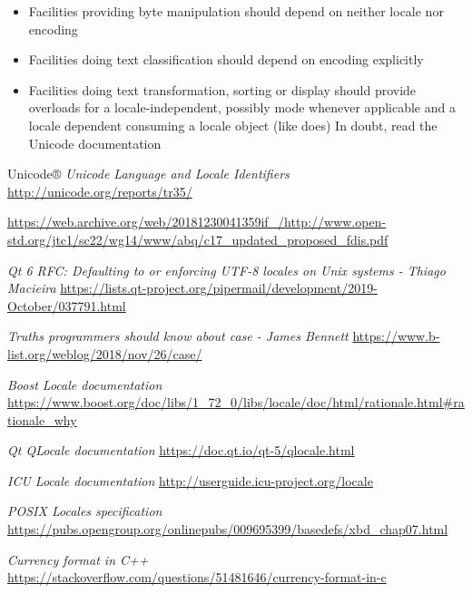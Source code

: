 \documentclass{wg21}
\begin{document}
\begin{itemize}
\item Facilities providing byte manipulation should depend on neither locale nor encoding
\item Facilities doing text classification should depend on encoding explicitly 
\item Facilities doing text transformation, sorting or display should provide overloads for a locale-independent, possibly  mode whenever applicable and a locale dependent consuming a locale object (like  does)
In doubt, read the Unicode documentation
\end{itemize}






\renewcommand{\section}[2]{}%
\begin{thebibliography}{9}
    \nocite{N4830}
    
    Unicode®
    \emph{Unicode Language and Locale Identifiers}\newline
    \url{http://unicode.org/reports/tr35/}

    \url{https://web.archive.org/web/20181230041359if_/http://www.open-std.org/jtc1/sc22/wg14/www/abq/c17_updated_proposed_fdis.pdf}  
       
    \emph{Qt 6 RFC: Defaulting to or enforcing UTF-8 locales on Unix systems - Thiago Macieira }\newline
    \url{https://lists.qt-project.org/pipermail/development/2019-October/037791.html}    
    
    
    \emph{Truths programmers should know about case -  James Bennett}\newline
    \url{https://www.b-list.org/weblog/2018/nov/26/case/}
    
    \emph{Boost Locale documentation}\newline
    \url{https://www.boost.org/doc/libs/1_72_0/libs/locale/doc/html/rationale.html#rationale_why}
    
    \emph{Qt QLocale documentation}\newline
    \url{https://doc.qt.io/qt-5/qlocale.html} 
    
    
    \emph{ICU Locale documentation}\newline
    \url{http://userguide.icu-project.org/locale} 
    
    \emph{POSIX Locales specification}\newline
    \url{https://pubs.opengroup.org/onlinepubs/009695399/basedefs/xbd_chap07.html}
    
    
    \emph{Currency format in C++}\newline
    \url{https://stackoverflow.com/questions/51481646/currency-format-in-c}
     
\end{thebibliography}
\end{document}
